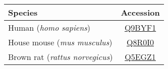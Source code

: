 \newcommand{\specstruc}[3]{#1 (\emph{#2}) & \href{https://alphafold.ebi.ac.uk/entry/#3}{#3} }

\begin{table}[h!]
    \begin{adjustwidth}{-12em}{-12em}
    \centering
    \begin{tabular}{lc}
        \hline
        \textbf{Species} & \textbf{Accession} \\
        \hline
        \specstruc{Human}{homo sapiens}{Q9BYF1} \\
        \specstruc{House mouse}{mus musculus}{Q8R0I0} \\
        \specstruc{Brown rat}{rattus norvegicus}{Q5EGZ1} \\
        \hline
    \end{tabular}
    \end{adjustwidth}
\end{table}